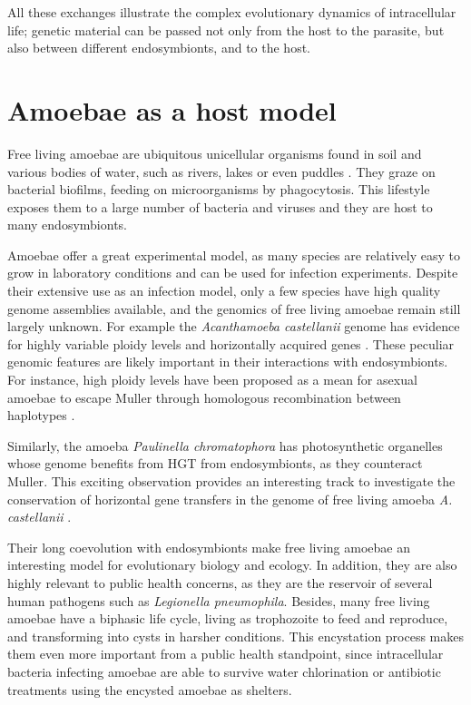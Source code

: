 All these exchanges illustrate the complex evolutionary dynamics of intracellular life; genetic material can be passed not only from the host to the parasite, but also between different endosymbionts, and to the host.

\section{Amoebae as a host model}

Free living amoebae are ubiquitous unicellular organisms found in soil and various bodies of water, such as rivers, lakes \cite{johnSeasonalDistributionPathogenic1995} or even puddles \cite{sakamotoLegionellaPneumophilaRainwater2009}. They graze on bacterial biofilms, feeding on microorganisms by phagocytosis. This lifestyle exposes them to a large number of bacteria and viruses and they are host to many endosymbionts. 

Amoebae offer a great experimental model, as many species are relatively easy to grow in laboratory conditions and can be used for infection experiments. Despite their extensive use as an infection model, only a few species have high quality genome assemblies available, and the genomics of free living amoebae remain still largely unknown. For example the \textit{Acanthamoeba castellanii} genome has evidence for highly variable ploidy levels \cite{maciverAsexualAmoebaeEscape2016} and horizontally acquired genes \cite{clarkeGenomeAcanthamoebaCastellanii2013}. These peculiar genomic features are likely important in their interactions with endosymbionts. For instance, high ploidy levels have been proposed as a mean for asexual amoebae to escape \Gls{Muller} through homologous recombination between haplotypes \cite{maciverAsexualAmoebaeEscape2016}.

Similarly, the amoeba \textit{Paulinella chromatophora} has photosynthetic organelles whose genome benefits from HGT from endosymbionts, as they counteract \Gls{Muller}. This exciting observation provides an interesting track to investigate the conservation of horizontal gene transfers in the genome of free living amoeba \textit{A. castellanii} \cite{clarkeGenomeAcanthamoebaCastellanii2013}.

Their long coevolution with endosymbionts make free living amoebae an interesting model for evolutionary biology and ecology. In addition, they are also highly relevant to public health concerns, as they are the reservoir of several human pathogens such as \textit{Legionella pneumophila}. Besides, many free living amoebae have a biphasic life cycle, living as trophozoite to feed and reproduce, and transforming into cysts in harsher conditions. This encystation process makes them even more important from a public health standpoint, since intracellular bacteria infecting amoebae are able to survive water chlorination or antibiotic treatments using the encysted amoebae as shelters.

